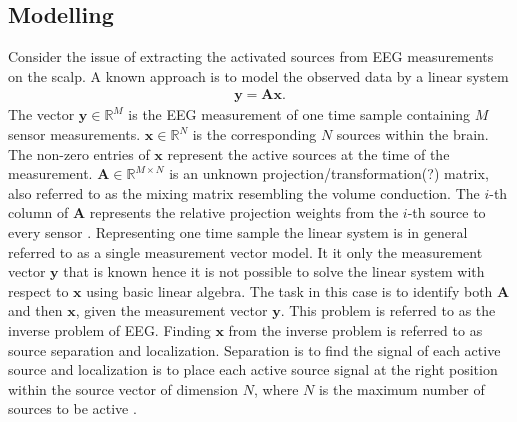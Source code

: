 %     


\subsection{Modelling}
Consider the issue of extracting the activated sources from  EEG measurements on the scalp. A known approach is to model the observed data by a linear system 
\begin{align*}
\mathbf{y} = \mathbf{Ax}.
\end{align*}
The vector $\mathbf{y} \in \mathbb{R}^{M}$ is the EEG measurement of one time sample containing $M$ sensor measurements. $\mathbf{x} \in \mathbb{R}^{N}$ is the corresponding $N$ sources within the brain. 
The non-zero entries of $\textbf{x}$ represent the active sources at the time of the measurement. 
$\mathbf{A} \in \mathbb{R}^{M \times N}$ is an unknown projection/transformation(?) matrix, also referred to as the mixing matrix resembling the volume conduction. 
The $i$-th column of $\mathbf{A}$ represents the relative projection weights from the $i$-th source to every sensor \cite{phd2015}. 
Representing one time sample the linear system is in general referred to as a single measurement vector model. 
It it only the measurement vector $\textbf{y}$ that is known hence it is not possible to solve the linear system with respect to $\textbf{x}$ using basic linear algebra.   
The task in this case is to identify both $\mathbf{A}$ and then $\mathbf{x}$, given the measurement vector $\mathbf{y}$. This problem is referred to as the inverse problem of EEG. 
Finding $\textbf{x}$ from the inverse problem is referred to as source separation and localization. Separation is to find the signal of each active source and localization is to place each active source signal at the right position within the source vector of dimension $N$, where $N$ is the maximum number of sources to be active .      

